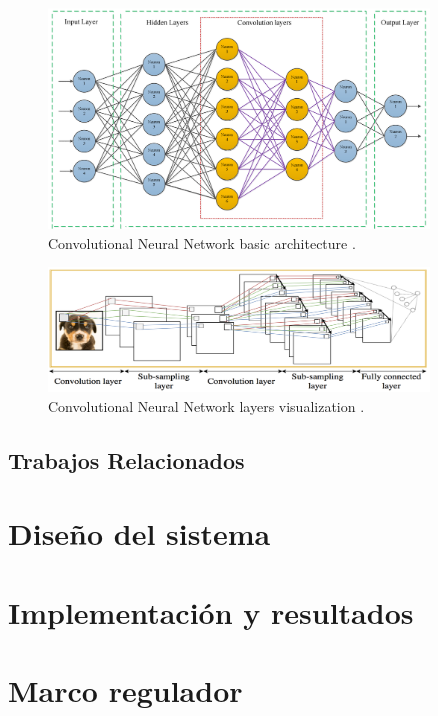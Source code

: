 \documentclass[12pt]{report} %
\begin{document}
\begin{figure}[H]
	\centering
	\includegraphics[width=0.9\textwidth]{cnnStructure.png}
	\caption{Convolutional Neural Network basic architecture \cite{annReview}.}
	\label{fig:imagen27}
\end{figure}

\begin{figure}[H]
	\centering
	\includegraphics[width=0.9\textwidth]{basicCnn.png}
	\caption{Convolutional Neural Network layers visualization \cite{deepImages}.}
	\label{fig:imagen28}
\end{figure}

\section{Trabajos Relacionados}



\chapter{Diseño del sistema}



\chapter{Implementación y resultados}



\chapter{Marco regulador}
\end{document}
